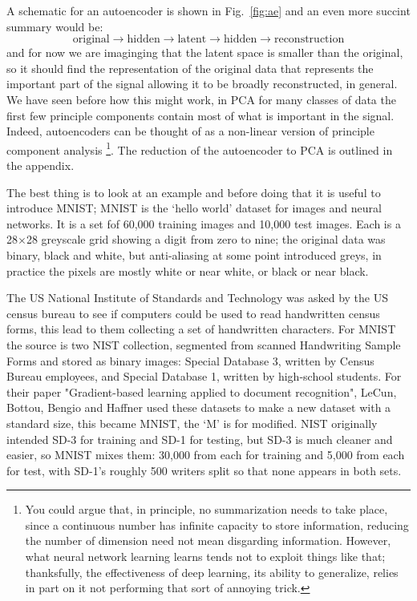 \documentclass[12pt]{article}
\begin{document}
A schematic for an autoencoder is shown in Fig.~\ref{fig:ae} and an even more succint summary would be:
\begin{equation}
\text{original}\rightarrow \text{hidden}\rightarrow \text{latent} \rightarrow \text{hidden}\rightarrow\text{reconstruction}
\end{equation}
and for now we are imaginging that the latent space is smaller than
the original, so it should find the representation of the original
data that represents the important part of the signal allowing it to
be broadly reconstructed, in general. We have seen before how this
might work, in PCA for many classes of data the first few principle
components contain most of what is important in the signal. Indeed,
autoencoders can be thought of as a non-linear version of principle
component analysis
\footnote{You could argue that, in principle, no summarization needs
to take place, since a continuous number has infinite capacity to
store information, reducing the number of dimension need not mean
disgarding information. However, what neural network learning learns
tends not to exploit things like that; thanksfully, the effectiveness
of deep learning, its ability to generalize, relies in part on it not
performing that sort of annoying trick.}. The reduction of the
autoencoder to PCA is outlined in the appendix.

The best thing is to look at an example and before doing that it is
useful to introduce MNIST; MNIST is the `hello world' dataset for
images and neural networks. It is a set fof 60,000 training images and
10,000 test images. Each is a 28$\times$28 greyscale grid showing a
digit from zero to nine; the original data was binary, black and
white, but anti-aliasing at some point introduced greys, in practice
the pixels are mostly white or near white, or black or near black.

The US National Institute of Standards and Technology was asked by the
US census bureau to see if computers could be used to read handwritten
census forms, this lead to them collecting a set of handwritten
characters.  For MNIST the source is two NIST collection, segmented
from scanned Handwriting Sample Forms and stored as binary images:
Special Database 3, written by Census Bureau employees, and Special
Database 1, written by high-school students. For their paper
"Gradient-based learning applied to document recognition", LeCun,
Bottou, Bengio and Haffner used these datasets to make a new dataset
with a standard size, this became MNIST, the `M' is for modified. NIST
originally intended SD-3 for training and SD-1 for testing, but SD-3
is much cleaner and easier, so MNIST mixes them: 30,000 from each for
training and 5,000 from each for test, with SD-1's roughly 500 writers
split so that none appears in both sets.
\end{document}
